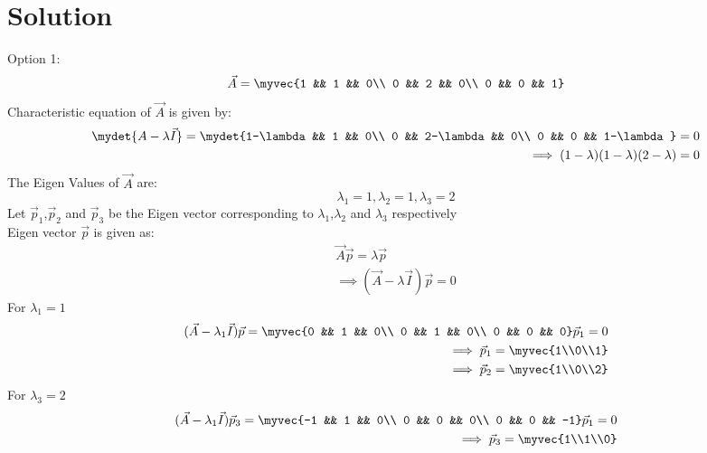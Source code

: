 \documentclass[journal,12pt,twocolumn]{IEEEtran}
\begin{document}
\section{Solution}
Option 1:
\begin{equation*}
\vec{A} = \myvec{1 && 1 && 0\\ 0 && 2 && 0\\ 0 && 0 && 1}
\end{equation*}
Characteristic equation of $\vec{A}$ is given by:
\begin{equation} \label{3.0.1}
\begin{split}
\mydet{A-\lambda \vec{I}}=\mydet{1-\lambda && 1 && 0\\ 0 && 2-\lambda && 0\\ 0 && 0 && 1-\lambda} = 0\\
\implies (1-\lambda)(1-\lambda)(2-\lambda) = 0
\end{split}
\end{equation}
The Eigen Values of $\vec{A}$ are:
\begin{equation} \label{3.0.2}
\lambda_1 = 1, \lambda_2 = 1, \lambda_3 = 2
\end{equation}
Let $\vec{p}_1$,$\vec{p}_2$ and $\vec{p}_3$ be the Eigen vector corresponding to $\lambda_1$,$\lambda_2$ and $\lambda_3$ respectively\\
Eigen vector $\vec{p}$ is given as:
\begin{equation} \label{3.0.3}
\begin{split}
\vec{A}\vec{p} = \lambda\vec{p}\\
\implies (\vec{A} - \lambda \vec{I})\vec{p} = 0
\end{split}
\end{equation}
For $\lambda_1 = 1$
\begin{equation}\label{3.0.4}
\begin{split}
(\vec{A} - \lambda_1 \vec{I})\vec{p} = \myvec{0 && 1 && 0\\ 0 && 1 && 0\\ 0 && 0 && 0}\vec{p}_1 = 0\\ 
\implies \vec{p}_1 = \myvec{1\\0\\1}\\
\implies \vec{p}_2 = \myvec{1\\0\\2}
\end{split}
\end{equation}
For $\lambda_3 = 2$
\begin{equation}\label{3.0.5}
\begin{split}
(\vec{A} - \lambda_1 \vec{I})\vec{p}_3 = \myvec{-1 && 1 && 0\\ 0 && 0 && 0\\ 0 && 0 && -1}\vec{p}_1 = 0\\ 
\implies \vec{p}_3 = \myvec{1\\1\\0}
\end{split}
\end{equation}
\end{document}
